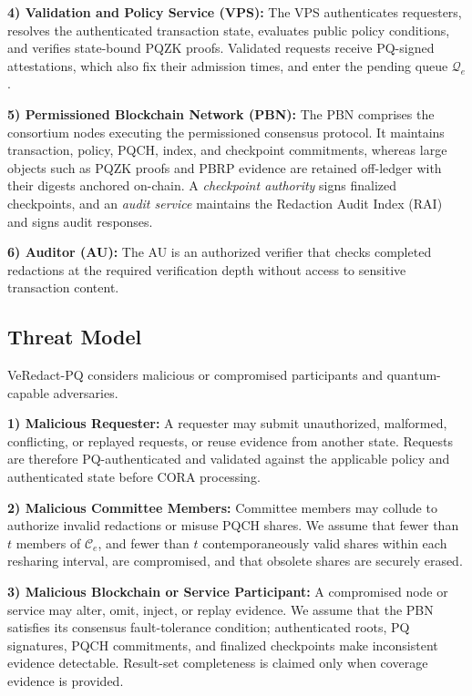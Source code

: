 \documentclass[lettersize,journal]{IEEEtran}
\begin{document}
\textbf{4) Validation and Policy Service (VPS):}
The VPS authenticates requesters, resolves the authenticated transaction
state, evaluates public policy conditions, and verifies state-bound PQZK
proofs. Validated requests receive PQ-signed attestations, which also
fix their admission times, and enter the pending queue $\mathcal{Q}_e$.

\textbf{5) Permissioned Blockchain Network (PBN):}
The PBN comprises the consortium nodes executing the permissioned
consensus protocol. It maintains transaction, policy, PQCH, index, and
checkpoint commitments, whereas large objects such as PQZK proofs and
PBRP evidence are retained off-ledger with their digests anchored
on-chain. A \emph{checkpoint authority} signs finalized checkpoints, and
an \emph{audit service} maintains the Redaction Audit Index (RAI) and
signs audit responses.

\textbf{6) Auditor (AU):}
The AU is an authorized verifier that checks completed redactions at
the required verification depth without access to sensitive transaction
content.
\subsection{Threat Model}
\label{subsec:threat}

VeRedact-PQ considers malicious or compromised participants and
quantum-capable adversaries.

\textbf{1) Malicious Requester:}
A requester may submit unauthorized, malformed, conflicting, or
replayed requests, or reuse evidence from another state. Requests are
therefore PQ-authenticated and validated against the applicable policy
and authenticated state before CORA processing.

\textbf{2) Malicious Committee Members:}
Committee members may collude to authorize invalid redactions or misuse
PQCH shares. We assume that fewer than $t$ members of $\mathcal{C}_e$,
and fewer than $t$ contemporaneously valid shares within each resharing
interval, are compromised, and that obsolete shares are securely erased.

\textbf{3) Malicious Blockchain or Service Participant:}
A compromised node or service may alter, omit, inject, or replay
evidence. We assume that the PBN satisfies its consensus
fault-tolerance condition; authenticated roots, PQ signatures, PQCH
commitments, and finalized checkpoints make inconsistent evidence
detectable. Result-set completeness is claimed only when coverage
evidence is provided.
\end{document}
